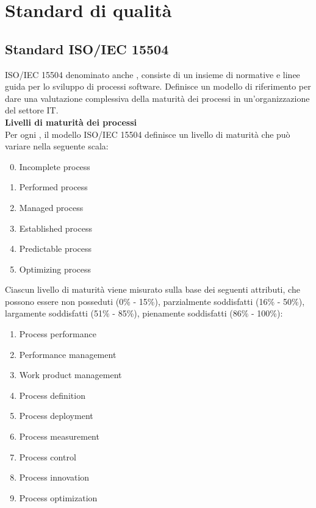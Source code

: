 \section{Standard di qualità} 
\subsection{Standard ISO/IEC 15504}\label{AppQualitaProcessi}
ISO/IEC 15504 denominato anche \textbf{}, consiste di un insieme di normative e linee guida per lo sviluppo di processi software.
Definisce un modello di riferimento per dare una valutazione complessiva della maturità dei processi in un'organizzazione del settore IT.\\
\textbf{Livelli di maturità dei processi}\\
Per ogni , il modello ISO/IEC 15504 definisce un livello di maturità che può variare nella seguente scala:
\begin{enumerate}
\setcounter{enumi}{-1}
\item Incomplete process
\item Performed process
\item Managed process
\item Established process
\item Predictable process  
\item Optimizing process
\end{enumerate}
Ciascun livello di maturità viene misurato sulla base dei seguenti attributi, che possono essere non posseduti (0\% - 15\%), parzialmente soddisfatti (16\% - 50\%), largamente soddisfatti (51\% - 85\%), pienamente soddisfatti (86\% - 100\%):
\begin{enumerate}
\item Process performance
\item Performance management
\item Work product management
\item Process definition
\item Process deployment
\item Process measurement
\item Process control
\item Process innovation
\item Process optimization
\end{enumerate}
